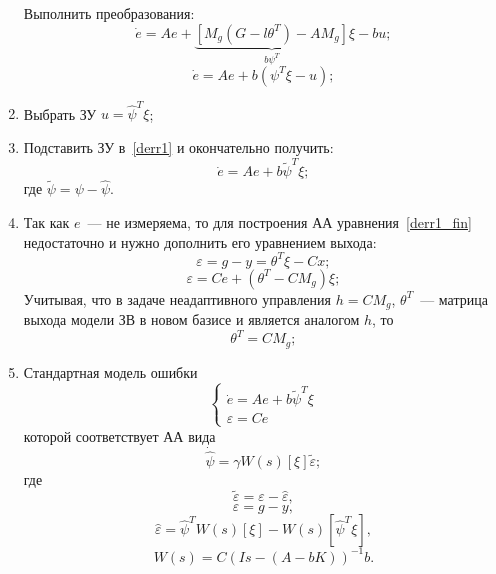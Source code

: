 \begin{enumerate}[1.]
		Выполнить преобразования:
		\begin{equation}
			\dot{e} = A e + \underbrace{\left[M_g(G - l \theta^T) - A M_g \right]}_{b \psi^T} \xi - b u;
		\end{equation}
		\begin{equation}\label{derr1}
			\dot{e} = A e + b (\psi^T \xi - u);
		\end{equation}
	\item Выбрать ЗУ $u = \hat{\psi}^T \xi$;
	\item Подставить ЗУ в~\eqref{derr1} и окончательно получить:
		\begin{equation}\label{derr1_fin}
			\dot{e} = A e + b \tilde{\psi}^T \xi;
		\end{equation}
		где $\tilde{\psi} = \psi - \hat{\psi}$.
	\item Так как $e$~--- не измеряема, то для построения АА уравнения~\eqref{derr1_fin} недостаточно и нужно дополнить его уравнением выхода:
		\begin{equation}
			\varepsilon = g - y = \theta^T \xi - C x;
		\end{equation}
		\begin{equation}
			\varepsilon = C e + (\theta^T - C M_g) \xi;
		\end{equation}
		Учитывая, что в задаче неадаптивного управления $h = C M_g$, $\theta^T$~--- матрица выхода модели ЗВ в новом базисе и является аналогом $h$, то
		\begin{equation}
			\theta^T = C M_g;
		\end{equation}
	\item Стандартная модель ошибки
		\begin{equation}
			\begin{cases}
				\dot{e} = A e + b \tilde{\psi}^T \xi \\
				\varepsilon = C e
			\end{cases}
		\end{equation}
		которой соответствует АА вида
		\begin{equation}
			\dot{\hat{\psi}} = \gamma W(s)[\xi] \tilde{\varepsilon}; 
		\end{equation}
		где
		\begin{equation}
			\tilde{\varepsilon} = \varepsilon - \hat{\varepsilon},
		\end{equation}
		\begin{equation}
			\varepsilon = g - y,
		\end{equation}
		\begin{equation}
			\hat{\varepsilon} = \hat{\psi}^T W(s)[\xi] - W(s)[\hat{\psi}^T \xi ],
		\end{equation}
		\begin{equation}
			W(s) = C (I s - (A - b K))^{-1} b.
		\end{equation}
		
\end{enumerate}


